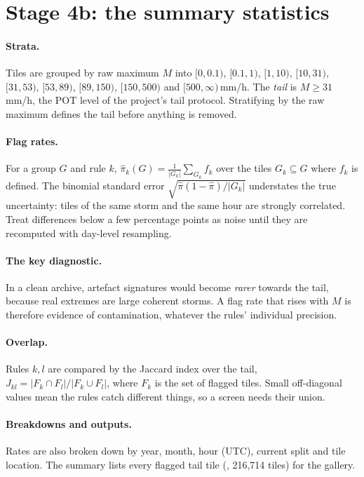 \documentclass[11pt,a4paper]{article}
\theoremstyle{definition}
\theoremstyle{remark}
\newcommand{\1}{\mathbf{1}}
\newcommand{\code}[1]{\texttt{\detokenize{#1}}}
\begin{document}
\section{Stage 4b: the summary statistics}\label{sec:summary}

\paragraph{Strata.}
Tiles are grouped by raw maximum $M$ into $[0,0.1)$, $[0.1,1)$, $[1,10)$, $[10,31)$,
$[31,53)$, $[53,89)$, $[89,150)$, $[150,500)$ and $[500,\infty)$\,mm/h. The \emph{tail} is
$M\ge31$\,mm/h, the POT level of the project's tail protocol. Stratifying by the raw maximum
defines the tail before anything is removed.

\paragraph{Flag rates.}
For a group $G$ and rule $k$, $\hat\pi_k(G)=\frac1{|G_k|}\sum_{G_k}f_k$ over the tiles
$G_k\subseteq G$ where $f_k$ is defined. The binomial standard error
$\sqrt{\hat\pi(1-\hat\pi)/|G_k|}$ understates the true uncertainty: tiles of the same storm
and the same hour are strongly correlated. Treat differences below a few percentage points
as noise until they are recomputed with day-level resampling.

\paragraph{The key diagnostic.}
In a clean archive, artefact signatures would become \emph{rarer} towards the tail, because
real extremes are large coherent storms. A flag rate that rises with $M$ is therefore
evidence of contamination, whatever the rules' individual precision.

\paragraph{Overlap.}
Rules $k,l$ are compared by the Jaccard index over the tail,
$J_{kl}=|F_k\cap F_l|/|F_k\cup F_l|$, where $F_k$ is the set of flagged tiles. Small off-diagonal
values mean the rules catch different things, so a screen needs their union.

\paragraph{Breakdowns and outputs.}
Rates are also broken down by year, month, hour (UTC), current split and tile location. The
summary lists every flagged tail tile (\code{flagged_tail.csv}, 216,714 tiles) for the
gallery.
\end{document}
